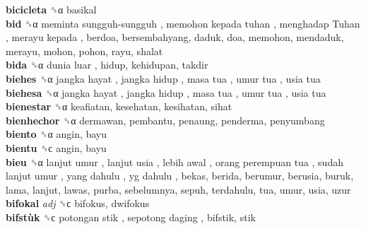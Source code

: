 \textbf{bicicleta} ␝α  basikal  \\
\textbf{bid} ␝α   meminta sungguh-sungguh ,  memohon kepada tuhan ,  menghadap Tuhan ,  merayu kepada , berdoa, bersembahyang, daduk, doa, memohon, mendaduk, merayu, mohon, pohon, rayu, shalat  \\
\textbf{bida} ␝α   dunia luar , hidup, kehidupan, takdir  \\
\textbf{biehes} ␝α   jangka hayat ,  jangka hidup ,  masa tua ,  umur tua ,  usia tua   \\
\textbf{biehesa} ␝α   jangka hayat ,  jangka hidup ,  masa tua ,  umur tua ,  usia tua   \\
\textbf{bienestar} ␝α  keafiatan, kesehatan, kesihatan, sihat  \\
\textbf{bienhechor} ␝α  dermawan, pembantu, penaung, penderma, penyumbang  \\
\textbf{biento} ␝α  angin, bayu  \\
\textbf{bientu} ␝ϲ  angin, bayu  \\
\textbf{bieu} ␝α   lanjut umur ,  lanjut usia ,  lebih awal ,  orang perempuan tua ,  sudah lanjut umur ,  yang dahulu ,  yg dahulu , bekas, berida, berumur, berusia, buruk, lama, lanjut, lawas, purba, sebelumnya, sepuh, terdahulu, tua, umur, usia, uzur  \\
\textbf{bifokal} \emph{adj}  ␝ϲ  bifokus, dwifokus  \\
\textbf{bifstùk} ␝ϲ   potongan stik ,  sepotong daging , bifstik, stik  \\
